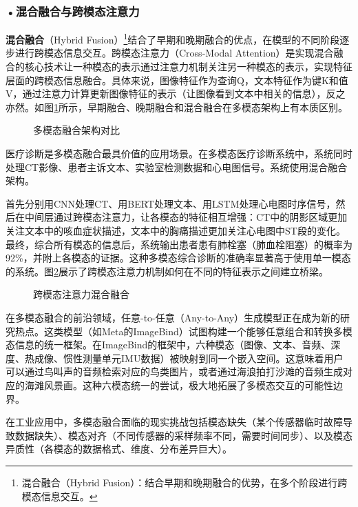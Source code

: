 \subsubsection*{\textbf{•混合融合与跨模态注意力}}

\textbf{混合融合}（Hybrid Fusion）\footnote{混合融合（Hybrid Fusion）：结合早期和晚期融合的优势，在多个阶段进行跨模态信息交互。}结合了早期和晚期融合的优点，在模型的不同阶段逐步进行跨模态信息交互。跨模态注意力（Cross-Modal Attention）是实现混合融合的核心技术让一种模态的表示通过注意力机制关注另一种模态的表示，实现特征层面的跨模态信息融合。具体来说，图像特征作为查询Q，文本特征作为键K和值V，通过注意力计算更新图像特征的表示（让图像看到文本中相关的信息），反之亦然。如图\ref{fig:ch2_2_32}所示，早期融合、晚期融合和混合融合在多模态架构上有本质区别。

\begin{figure}[H]
\centering
{}
\caption{多模态融合架构对比}
\label{fig:ch2_2_32}
\end{figure}

医疗诊断是多模态融合最具价值的应用场景。在多模态医疗诊断系统中，系统同时处理CT影像、患者主诉文本、实验室检测数据和心电图信号。系统使用混合融合架构。

首先分别用CNN处理CT、用BERT处理文本、用LSTM处理心电图时序信号，然后在中间层通过跨模态注意力，让各模态的特征相互增强：CT中的阴影区域更加关注文本中的咳血症状描述，文本中的胸痛描述更加关注心电图中ST段的变化。最终，综合所有模态的信息后，系统输出患者患有肺栓塞（肺血栓阻塞）的概率为92\%，并附上各模态的证据。这种多模态综合诊断的准确率显著高于使用单一模态的系统。图\ref{fig:ch2_2_33}展示了跨模态注意力机制如何在不同的特征表示之间建立桥梁。

\begin{figure}[H]
\centering
{}
\caption{跨模态注意力混合融合}
\label{fig:ch2_2_33}
\end{figure}

在多模态融合的前沿领域，任意-to-任意（Any-to-Any）生成模型正在成为新的研究热点。这类模型（如Meta的ImageBind）试图构建一个能够任意组合和转换多模态信息的统一框架。在ImageBind的框架中，六种模态（图像、文本、音频、深度、热成像、惯性测量单元IMU数据）被映射到同一个嵌入空间。这意味着用户可以通过鸟叫声的音频检索对应的鸟类图片，或者通过海浪拍打沙滩的音频生成对应的海滩风景画。这种六模态统一的尝试，极大地拓展了多模态交互的可能性边界。

在工业应用中，多模态融合面临的现实挑战包括模态缺失（某个传感器临时故障导致数据缺失）、模态对齐（不同传感器的采样频率不同，需要时间同步）、以及模态异质性（各模态的数据格式、维度、分布差异巨大）。

